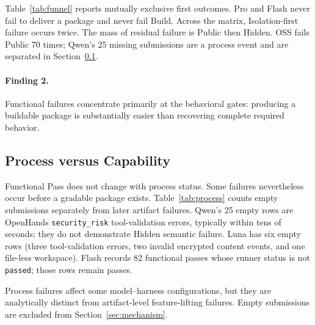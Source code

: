 Table~\ref{tab:funnel} reports mutually exclusive first outcomes. Pro and
Flash never fail to deliver a package and never fail Build. Across the
matrix, Isolation-first failure occurs twice. The mass of residual failure
is Public then Hidden. OSS fails Public 70 times; Qwen's 25 missing
submissions are a process event and are separated in
Section~\ref{sec:process}.

\begin{table}[t]
  \caption{Mutually exclusive first outcomes on freeze~v2 Python-150.}
  \label{tab:funnel}
  \centering
  
\end{table}

\paragraph{Finding 2.}
Functional failures concentrate primarily at the behavioral gates: producing
a buildable package is substantially easier than recovering complete required
behavior.

\subsection{Process versus Capability}
\label{sec:process}

Functional Pass does not change with process status. Some failures nevertheless
occur before a gradable package exists. Table~\ref{tab:process} counts empty
submissions separately from later artifact failures. Qwen's 25 empty rows are
OpenHands \texttt{security\_risk} tool-validation errors, typically within
tens of seconds; they do not demonstrate Hidden semantic failure. Luna has
six empty rows (three tool-validation errors, two invalid encrypted
content events, and one file-less workspace). Flash records 82 functional
passes whose runner status is not \texttt{passed}; those rows remain passes.

\begin{table}[t]
  \caption{Empty submissions on Python-150. Empty rows are functional
  failures and are excluded from Section~\ref{sec:mechanism}.}
  \label{tab:process}
  \centering
  
\end{table}

Process failures affect some model--harness configurations, but they are
analytically distinct from artifact-level feature-lifting failures. Empty
submissions are excluded from Section~\ref{sec:mechanism}.
